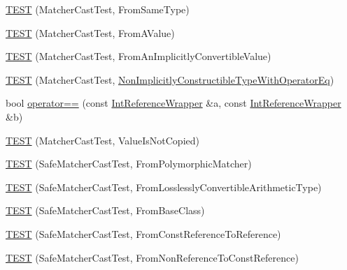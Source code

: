 \begin{DoxyCompactItemize}
\item 
\mbox{\hyperlink{namespacetesting_1_1gmock__matchers__test_a8f845dd5b1bcdc660926d67dce32b5d2}{T\+E\+ST}} (Matcher\+Cast\+Test, From\+Same\+Type)
\item 
\mbox{\hyperlink{namespacetesting_1_1gmock__matchers__test_a9dfc74e2f4c110e33bd7863c8bfd4532}{T\+E\+ST}} (Matcher\+Cast\+Test, From\+A\+Value)
\item 
\mbox{\hyperlink{namespacetesting_1_1gmock__matchers__test_af7fee66e5f72e05ba28bcf122b127a95}{T\+E\+ST}} (Matcher\+Cast\+Test, From\+An\+Implicitly\+Convertible\+Value)
\item 
\mbox{\hyperlink{namespacetesting_1_1gmock__matchers__test_a37953ae898b7426bce3104d95c098cba}{T\+E\+ST}} (Matcher\+Cast\+Test, \mbox{\hyperlink{structtesting_1_1gmock__matchers__test_1_1NonImplicitlyConstructibleTypeWithOperatorEq}{Non\+Implicitly\+Constructible\+Type\+With\+Operator\+Eq}})
\item 
bool \mbox{\hyperlink{namespacetesting_1_1gmock__matchers__test_a33c068c32bf5118e5be92771b146db77}{operator==}} (const \mbox{\hyperlink{structtesting_1_1gmock__matchers__test_1_1IntReferenceWrapper}{Int\+Reference\+Wrapper}} \&a, const \mbox{\hyperlink{structtesting_1_1gmock__matchers__test_1_1IntReferenceWrapper}{Int\+Reference\+Wrapper}} \&b)
\item 
\mbox{\hyperlink{namespacetesting_1_1gmock__matchers__test_ae99c08c8a815964b61f98a4785cf79b5}{T\+E\+ST}} (Matcher\+Cast\+Test, Value\+Is\+Not\+Copied)
\item 
\mbox{\hyperlink{namespacetesting_1_1gmock__matchers__test_a29c04361c022a71711dbf9d3cf2a5050}{T\+E\+ST}} (Safe\+Matcher\+Cast\+Test, From\+Polymorphic\+Matcher)
\item 
\mbox{\hyperlink{namespacetesting_1_1gmock__matchers__test_a70bbe53742db988a828d9e8201e34770}{T\+E\+ST}} (Safe\+Matcher\+Cast\+Test, From\+Losslessly\+Convertible\+Arithmetic\+Type)
\item 
\mbox{\hyperlink{namespacetesting_1_1gmock__matchers__test_a937469149aee65efde526091af1e4f78}{T\+E\+ST}} (Safe\+Matcher\+Cast\+Test, From\+Base\+Class)
\item 
\mbox{\hyperlink{namespacetesting_1_1gmock__matchers__test_a14ba7c67551222321056e4da6708010f}{T\+E\+ST}} (Safe\+Matcher\+Cast\+Test, From\+Const\+Reference\+To\+Reference)
\item 
\mbox{\hyperlink{namespacetesting_1_1gmock__matchers__test_ad53741423311d4f76d9d980f59ec8d65}{T\+E\+ST}} (Safe\+Matcher\+Cast\+Test, From\+Non\+Reference\+To\+Const\+Reference)

\end{DoxyCompactItemize}
